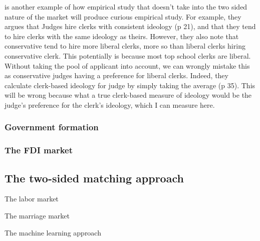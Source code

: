\citep{Bonica2017} is another example of how empirical study that doesn't take
into the two sided nature of the market will produce curious empirical study.
For example, they argues that Judges hire clerks with consistent ideology (p
21), and that they tend to hire clerks with the same ideology as theirs.
However, they also note that conservative tend to hire more liberal clerks, more
so than liberal clerks hiring conservative clerk. This potentially is because
most top school clerks are liberal. Without taking the pool of applicant into
account, we can wrongly mistake this as conservative judges having a preference
for liberal clerks. Indeed, they calculate clerk-based ideology for judge by
simply taking the average (p 35). This will be wrong because what a true
clerk-based measure of ideology would be the judge's preference for the clerk's
ideology, which I can measure here.

\subsubsection{Government formation}



\subsubsection{The FDI market}

\subsection{The two-sided matching approach}

The labor market

The marriage market

The machine learning approach